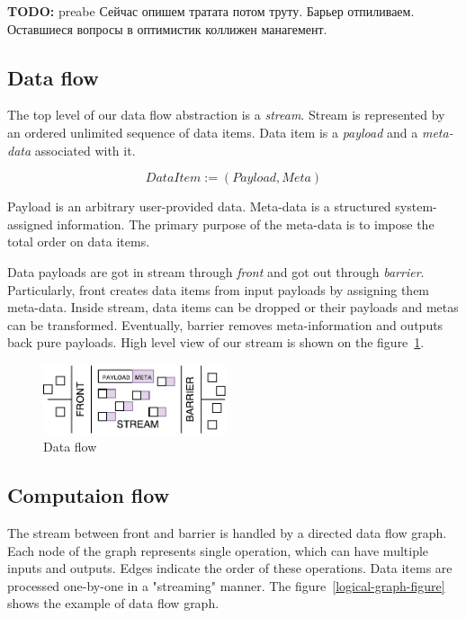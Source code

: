 
\label {fs-model}

{\bf TODO:} preabe
Сейчас опишем тратата потом труту.
Барьер отпиливаем. 
Оставшиеся вопросы в оптимистик коллижен манагемент.

\subsection{Data flow}

The top level of our data flow abstraction is a {\it stream}. Stream is represented by an ordered unlimited sequence of data items. Data item is a {\it payload} and a {\it meta-data} associated with it. 

\[DataItem := (Payload, Meta)\]

Payload is an arbitrary user-provided data. Meta-data is a structured system-assigned information. The primary purpose of the meta-data is to impose the total order on data items. 

Data payloads are got in stream through {\it front} and got out through {\it barrier}. Particularly, front creates data items from input payloads by assigning them meta-data. Inside stream, data items can be dropped or their payloads and metas can be transformed. Eventually, barrier removes meta-information and outputs back pure payloads. High level view of our stream is shown on the figure~\ref{stream}.

\begin{figure}[htbp]
  \centering
  \includegraphics[width=0.48\textwidth]{pics/stream}
  \caption{Data flow}
  \label {stream}
\end{figure}

\subsection{Computaion flow}

The stream between front and barrier is handled by a directed data flow graph. Each node of the graph represents single operation, which can have multiple inputs and outputs. Edges indicate the order of these operations. Data items are processed one-by-one in a "streaming" manner. The figure~\ref{logical-graph-figure} shows the example of data flow graph.

